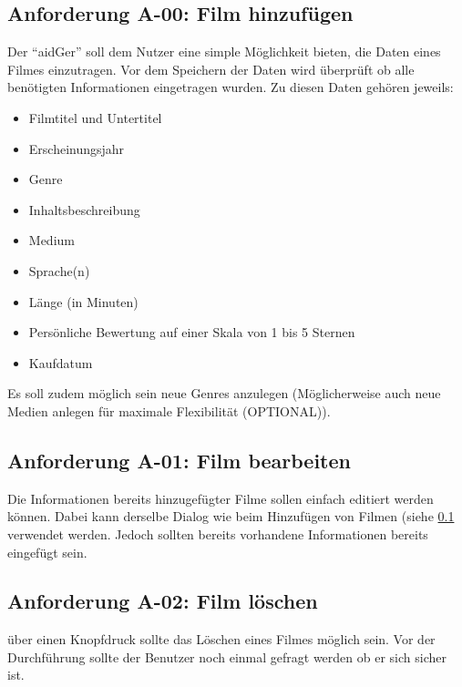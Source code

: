\documentclass[oneside,german,oneside]{scrbook}
\begin{document}
    \subsection{Anforderung A-00: Film hinzuf\"ugen}\label{anf:00}

        Der ``aidGer'' soll dem Nutzer eine simple M\"oglichkeit bieten, die
        Daten eines Filmes einzutragen. Vor dem Speichern der Daten wird
        \"uberpr\"uft ob alle ben\"otigten Informationen eingetragen wurden. Zu
        diesen Daten geh\"oren jeweils:

        \begin{itemize}
          \item Filmtitel und Untertitel
          \item Erscheinungsjahr
          \item Genre
          \item Inhaltsbeschreibung
          \item Medium
          \item Sprache(n)
          \item L\"ange (in Minuten)
          \item Pers\"onliche Bewertung auf einer Skala von 1 bis 5 Sternen
          \item Kaufdatum
        \end{itemize}

        Es soll zudem m\"oglich sein neue Genres anzulegen (M\"oglicherweise auch
        neue Medien anlegen f\"ur maximale Flexibilit\"at (OPTIONAL)).

    \subsection{Anforderung A-01: Film bearbeiten}\label{anf:01}

     Die Informationen bereits hinzugefügter Filme sollen einfach editiert werden
     können. Dabei kann derselbe Dialog wie beim Hinzufügen von Filmen (siehe
     \ref{anf:00} verwendet werden. Jedoch sollten bereits vorhandene
     Informationen bereits eingefügt sein.

    \subsection{Anforderung A-02: Film l\"oschen}\label{anf:02}

        \"uber einen Knopfdruck sollte das L\"oschen eines Filmes m\"oglich sein. Vor
        der Durchf\"uhrung sollte der Benutzer noch einmal gefragt werden ob er
        sich sicher ist.
\end{document}
